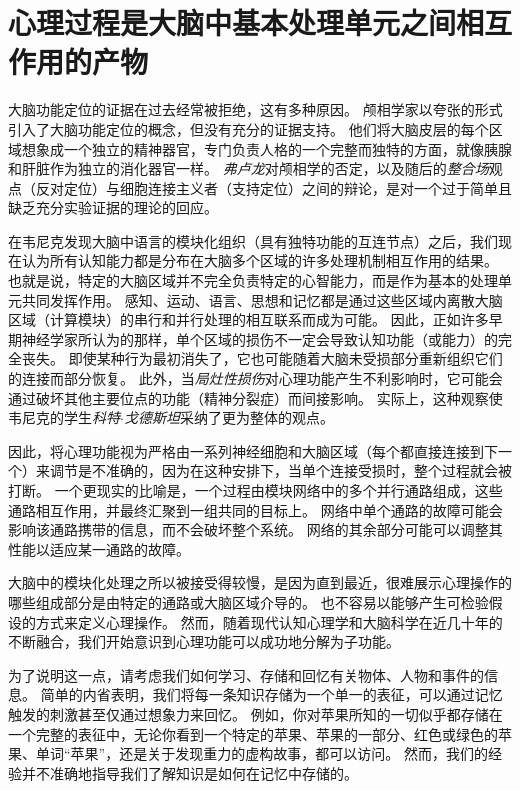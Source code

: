 \section{心理过程是大脑中基本处理单元之间相互作用的产物}

大脑功能定位的证据在过去经常被拒绝，这有多种原因。
颅相学家以夸张的形式引入了大脑功能定位的概念，但没有充分的证据支持。
他们将大脑皮层的每个区域想象成一个独立的精神器官，专门负责人格的一个完整而独特的方面，就像胰腺和肝脏作为独立的消化器官一样。
\textit{弗卢龙}对颅相学的否定，以及随后的\textit{整合场}观点（反对定位）与细胞连接主义者（支持定位）之间的辩论，是对一个过于简单且缺乏充分实验证据的理论的回应。


在韦尼克发现大脑中语言的模块化组织（具有独特功能的互连节点）之后，我们现在认为所有认知能力都是分布在大脑多个区域的许多处理机制相互作用的结果。
也就是说，特定的大脑区域并不完全负责特定的心智能力，而是作为基本的处理单元共同发挥作用。
感知、运动、语言、思想和记忆都是通过这些区域内离散大脑区域（计算模块）的串行和并行处理的相互联系而成为可能。
因此，正如许多早期神经学家所认为的那样，单个区域的损伤不一定会导致认知功能（或能力）的完全丧失。
即使某种行为最初消失了，它也可能随着大脑未受损部分重新组织它们的连接而部分恢复。
此外，当\textit{局灶性损伤}对心理功能产生不利影响时，它可能会通过破坏其他主要位点的功能（精神分裂症）而间接影响。
实际上，这种观察使韦尼克的学生\textit{科特$\cdot$戈德斯坦}采纳了更为整体的观点。



因此，将心理功能视为严格由一系列神经细胞和大脑区域（每个都直接连接到下一个）来调节是不准确的，因为在这种安排下，当单个连接受损时，整个过程就会被打断。
一个更现实的比喻是，一个过程由模块网络中的多个并行通路组成，这些通路相互作用，并最终汇聚到一组共同的目标上。
网络中单个通路的故障可能会影响该通路携带的信息，而不会破坏整个系统。
网络的其余部分可能可以调整其性能以适应某一通路的故障。



大脑中的模块化处理之所以被接受得较慢，是因为直到最近，很难展示心理操作的哪些组成部分是由特定的通路或大脑区域介导的。
也不容易以能够产生可检验假设的方式来定义心理操作。
然而，随着现代认知心理学和大脑科学在近几十年的不断融合，我们开始意识到心理功能可以成功地分解为子功能。


为了说明这一点，请考虑我们如何学习、存储和回忆有关物体、人物和事件的信息。
简单的内省表明，我们将每一条知识存储为一个单一的表征，可以通过记忆触发的刺激甚至仅通过想象力来回忆。
例如，你对苹果所知的一切似乎都存储在一个完整的表征中，无论你看到一个特定的苹果、苹果的一部分、红色或绿色的苹果、单词“苹果”，还是关于发现重力的虚构故事，都可以访问。
然而，我们的经验并不准确地指导我们了解知识是如何在记忆中存储的。





